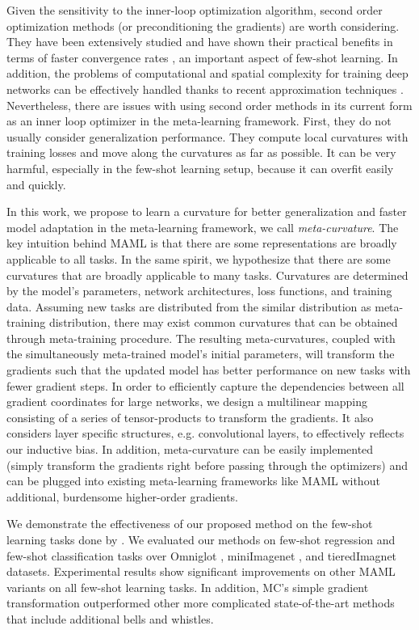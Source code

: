 \documentclass{article}
\begin{document}
Given the sensitivity to the inner-loop optimization algorithm, second order optimization methods (or preconditioning the gradients) are worth considering. They have been extensively studied and have shown their practical benefits in terms of faster convergence rates \cite{Nocedal_2006}, an important aspect of few-shot learning. In addition, the problems of computational and spatial complexity for training deep networks can be effectively handled thanks to recent approximation techniques \cite{Martens-icml-2015,LeRoux-2008}. Nevertheless, there are issues with using second order methods in its current form as an inner loop optimizer in the meta-learning framework. First, they do not usually consider generalization performance. They compute local curvatures with training losses and move along the curvatures as far as possible. It can be very harmful, especially in the few-shot learning setup, because it can overfit easily and quickly. 

In this work, we propose to learn a curvature for better generalization and faster model adaptation in the meta-learning framework, we call \textit{meta-curvature}. The key intuition behind MAML is that there are some representations are broadly applicable to all tasks. In the same spirit, we hypothesize that there are some curvatures that are broadly applicable to many tasks. Curvatures are determined by the model's parameters, network architectures, loss functions, and training data. Assuming new tasks are distributed from the similar distribution as meta-training distribution, there may exist common curvatures that can be obtained through meta-training procedure. The resulting meta-curvatures, coupled with the simultaneously meta-trained model's initial parameters, will transform the gradients such that the updated model has better performance on new tasks with fewer gradient steps. In order to efficiently capture the dependencies between all gradient coordinates for large networks, we design a multilinear mapping consisting of a series of tensor-products to transform the gradients. It also considers layer specific structures, e.g. convolutional layers, to effectively reflects our inductive bias. In addition, meta-curvature can be easily implemented (simply transform the gradients right before passing through the optimizers) and can be plugged into existing meta-learning frameworks like MAML without additional, burdensome higher-order gradients. 

We demonstrate the effectiveness of our proposed method on the few-shot learning tasks done by \cite{matchingnet,Ravi-iclr-2017,Finn-icml-2017}. We evaluated our methods on few-shot regression and few-shot classification tasks over Omniglot \cite{Lake1332}, miniImagenet \cite{matchingnet}, and tieredImagnet \cite{ren-iclr18} datasets. Experimental results show significant improvements on other MAML variants on all few-shot learning tasks. 
In addition, MC's simple gradient transformation outperformed other more complicated state-of-the-art methods that include additional bells and whistles.
\end{document}
